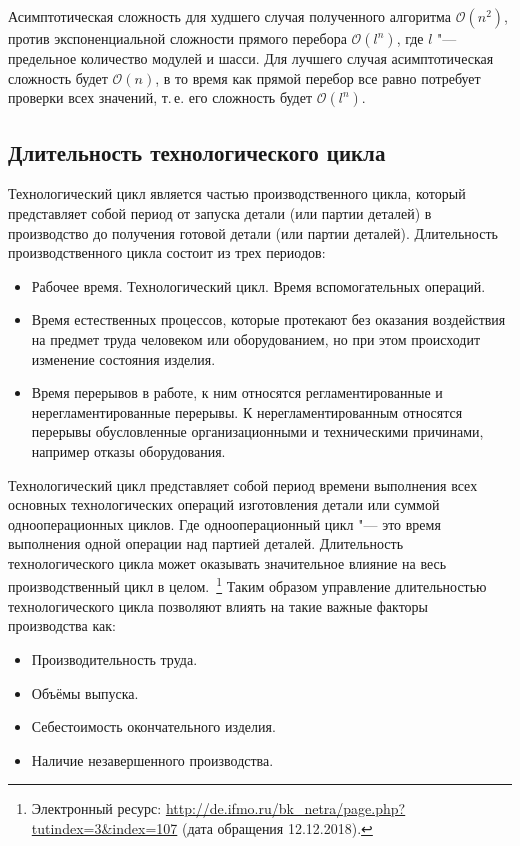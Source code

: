 Асимптотическая сложность для худшего случая полученного алгоритма $\mathcal{O}(n^2)$, против экспоненциальной сложности прямого перебора $\mathcal{O}(l^n)$, где $l$ "--- предельное количество модулей и шасси.
Для лучшего случая асимптотическая сложность будет $\mathcal{O}(n)$, в то время как прямой перебор все равно потребует проверки всех значений, т.\,е. его сложность будет $\mathcal{O}(l^n)$.


\subsection{Длительность технологического цикла}

Технологический цикл является частью производственного цикла, который представляет собой период от запуска детали (или партии деталей) в производство до получения готовой детали (или партии деталей). Длительность производственного цикла состоит из трех периодов:

\begin{itemize}
	\item Рабочее время.
		\subitem Технологический цикл.
		\subitem Время вспомогательных операций.
	\item Время естественных процессов, которые протекают без оказания воздействия на предмет труда человеком или оборудованием, но при этом происходит изменение состояния изделия.
	\item Время перерывов в работе, к ним относятся регламентированные и нерегламентированные перерывы. К нерегламентированным относятся перерывы обусловленные организационными и техническими причинами, например отказы оборудования.
\end{itemize}

Технологический цикл представляет собой период времени выполнения  всех основных технологических операций изготовления детали или суммой однооперационных циклов. Где однооперационный цикл "--- это время выполнения одной операции над партией деталей. Длительность технологического цикла может оказывать значительное влияние на весь производственный цикл в целом.~\footnote{Электронный ресурс: {\tiny\url{http://de.ifmo.ru/bk_netra/page.php?tutindex=3&index=107}} (дата обращения 12.12.2018).} Таким образом управление длительностью технологического цикла позволяют влиять на такие важные факторы производства как:

\begin{itemize}
	\item Производительность труда.
	\item Объёмы выпуска.
	\item Себестоимость окончательного изделия.
	\item Наличие незавершенного производства.
\end{itemize}

